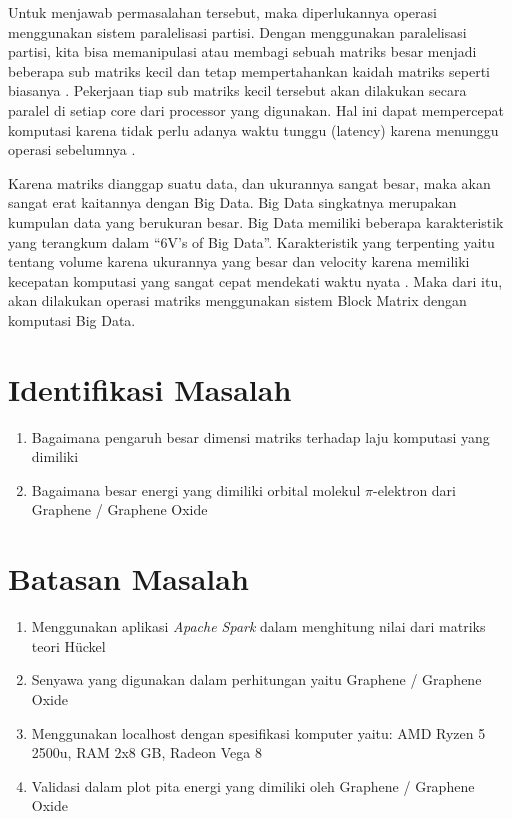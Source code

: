 \documentclass[12pt,a4paper]{report}
\begin{document}
	Untuk menjawab permasalahan tersebut, maka diperlukannya operasi menggunakan sistem paralelisasi partisi. Dengan menggunakan paralelisasi partisi, kita bisa memanipulasi atau membagi sebuah matriks besar menjadi beberapa sub matriks kecil dan tetap mempertahankan kaidah matriks seperti biasanya \cite{Ni2015}. Pekerjaan tiap sub matriks kecil tersebut akan dilakukan secara paralel di setiap core dari processor yang digunakan. Hal ini dapat mempercepat komputasi karena tidak perlu adanya waktu tunggu (latency) karena menunggu operasi sebelumnya \cite{Clayden2012}.  
	
	Karena matriks dianggap suatu data, dan ukurannya sangat besar, maka akan sangat erat kaitannya dengan Big Data. Big Data singkatnya merupakan kumpulan data yang berukuran besar. Big Data memiliki beberapa karakteristik yang terangkum dalam “6V’s of Big Data”. Karakteristik yang terpenting yaitu tentang volume karena ukurannya yang besar dan velocity karena memiliki kecepatan komputasi yang sangat cepat mendekati waktu nyata \cite{Clemons2010}. Maka dari itu, akan dilakukan operasi matriks menggunakan sistem Block Matrix dengan komputasi Big Data.


	\section{Identifikasi Masalah}
	\begin{enumerate}
		\item Bagaimana pengaruh besar dimensi matriks terhadap laju komputasi yang dimiliki
	   	\item Bagaimana besar energi yang dimiliki orbital molekul {$\pi$}-elektron dari Graphene / Graphene Oxide
	\end{enumerate}

	\section{Batasan Masalah}
	\begin{enumerate}
		\item Menggunakan aplikasi \textit{Apache Spark} dalam menghitung nilai dari matriks teori Hückel
		\item Senyawa yang digunakan dalam perhitungan yaitu Graphene / Graphene Oxide
		\item Menggunakan localhost dengan spesifikasi komputer yaitu: AMD Ryzen 5 2500u, RAM 2x8 GB, Radeon Vega 8
		\item Validasi dalam plot pita energi yang dimiliki oleh Graphene / Graphene Oxide
	\end{enumerate}
\end{document}
